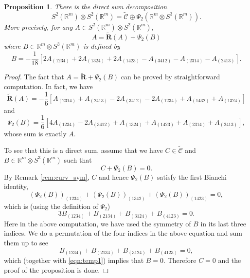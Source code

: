 \documentclass{amsart}
\newtheorem{prop}[thm]{Proposition}
\newcommand{\Real}{\mathbb R}
\numberwithin{equation}{section}
\begin{document}
\begin{prop}
	\label{prop:psi2}
	There is the direct sum decomposition
	\[
		S^2(\Real^m)\otimes S^2(\Real^m) = \widetilde{\mathcal C} \oplus  \Psi_2(\Real^m \otimes S^3(\Real^m)).
	\]
	More precisely, for any $A\in S^2(\Real^m) \otimes S^2(\Real^m)$,
	\[
		A= \tilde{\mathbf R}(A)+ \Psi_2(B)
	\]
	where $B\in \Real^m \otimes S^3(\Real^m)$ is defined by
	\begin{equation}
		\label{eqn:B}
		B= -\frac{1}{18}[2A_{(1234)}+2A_{(1324)}+2A_{(1423)}-A_{(3412)}-A_{(2314)}-A_{(2413)}].
	\end{equation}
\end{prop}
\begin{proof}
	The fact that $A= \tilde{\mathbf R}+\Psi_2(B)$ can be proved by straightforward computation. In fact, we have 
	\[
		\tilde{\mathbf R}(A)= -\frac{1}{6}[A_{(2314)}+A_{(2413)}-2A_{(3412)}-2A_{(1234)}+A_{(1432)}+A_{(1324)}]
	\]
	and 
	\[
		\Psi_2(B)=\frac{1}{6}\left[ 4A_{(1234)}-2A_{(3412)}+A_{(1324)}+A_{(1423)}+A_{(2314)}+A_{(2413)} \right],
	\]
	whose sum is exactly $A$.

	To see that this is a direct sum, assume that we have $C\in \widetilde{\mathcal C}$ and $B\in \Real^m \otimes S^3(\Real^m)$ such that
	\[
		C+ \Psi_2(B)=0.
	\]
	By Remark \ref{rem:curv_sym}, $C$ and hence $\Psi_2(B)$ satisfy the first Bianchi identity,
	\[
		(\Psi_2(B))_{(1234)}+(\Psi_2(B))_{(1342)}+(\Psi_2(B))_{(1423)}=0,	
	\]
	which is (using the definition of $\Psi_2$)
	\begin{equation}
		\label{eqn:temp1}
		3B_{(1234)}+ B_{(2134)}+B_{(3124)}+B_{(4123)}=0.
	\end{equation}
	Here in the above computation, we have used the symmetry of $B$ in its last three indices. We do a permutation of the four indices in the above equation and sum them up to see
	\[
		B_{(1234)}+ B_{(2134)}+B_{(3124)}+B_{(4123)}=0,
	\]
	which (together with \eqref{eqn:temp1}) implies that $B=0$. Therefore $C=0$ and the proof of the proposition is done.
\end{proof}
\end{document}
